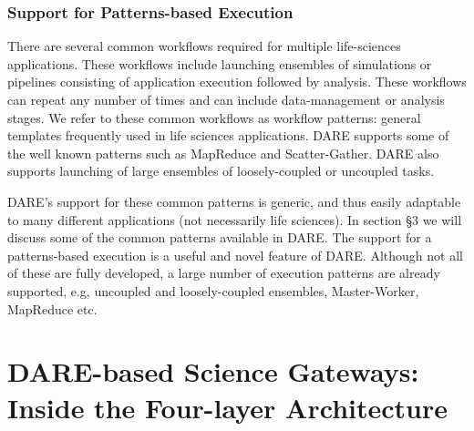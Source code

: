 \documentclass[]{svjour3}
\begin{document}
\subsubsection{Support for Patterns-based Execution}

There are several common workflows required for multiple life-sciences
applications. These workflows include launching ensembles of simulations
or pipelines consisting of application execution followed by analysis.
These workflows can repeat any number of times and can include
data-management or analysis stages. We refer to these common workflows
as workflow patterns: general templates frequently used in life sciences
applications. DARE supports some of the well known patterns such as MapReduce
and Scatter-Gather. DARE also supports launching of large ensembles
of loosely-coupled or uncoupled tasks.


DARE's support for these common patterns is generic, and thus easily
adaptable to many different applications (not necessarily life sciences).
In section \S3 we will discuss some of the common patterns available
in DARE. The support for a patterns-based execution is a useful and novel
feature of DARE. Although not all of these are fully developed,
a large number of execution patterns are already supported, e.g,
uncoupled and loosely-coupled ensembles, Master-Worker, MapReduce etc.

\section{DARE-based Science Gateways: Inside the Four-layer Architecture}

\end{document}
